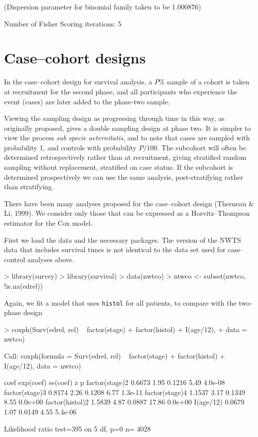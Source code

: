 \documentclass{article}
\begin{document}
\begin{Schunk}
\begin{Soutput}
(Dispersion parameter for binomial family taken to be 1.000876)

Number of Fisher Scoring iterations: 5
\end{Soutput}
\end{Schunk}


\section*{Case--cohort designs}
In the case--cohort design for survival analysis, a $P$\% sample of a cohort
is taken at recruitment for the second phase, and all participants who
experience the event (cases) are later added to the phase-two sample.

Viewing the sampling design as progressing through time in this way,
as originally proposed, gives a double sampling design at phase two.
It is simpler to view the process \emph{sub specie aeternitatis}, and
to note that cases are sampled with probability 1, and controls with
probability $P/100$. The subcohort will often be determined
retrospectively rather than at recruitment, giving stratified random
sampling without replacement, stratified on case status.  If the
subcohort is determined prospectively we can use the same analysis,
post-stratifying rather than stratifying.

There have been many analyses proposed for the case--cohort design
(Therneau \& Li, 1999).  We consider only those that can be expressed as a
Horvitz--Thompson estimator for the Cox model.



First we load the data and the necessary packages. The version of the
NWTS data that includes survival times is not identical to the data
set used for case--control analyses above.
\begin{Schunk}
\begin{Sinput}
> library(survey)
> library(survival)
> data(nwtco)
> ntwco <- subset(nwtco, !is.na(edrel))
\end{Sinput}
\end{Schunk}

Again, we fit a model that uses \texttt{histol} for all patients, to compare with the two-phase design
\begin{Schunk}
\begin{Sinput}
> coxph(Surv(edrel, rel) ~ factor(stage) + factor(histol) + I(age/12), 
+     data = nwtco)
\end{Sinput}
\begin{Soutput}
Call:
coxph(formula = Surv(edrel, rel) ~ factor(stage) + factor(histol) + 
    I(age/12), data = nwtco)


                  coef exp(coef) se(coef)     z       p
factor(stage)2  0.6673      1.95   0.1216  5.49 4.0e-08
factor(stage)3  0.8174      2.26   0.1208  6.77 1.3e-11
factor(stage)4  1.1537      3.17   0.1349  8.55 0.0e+00
factor(histol)2 1.5839      4.87   0.0887 17.86 0.0e+00
I(age/12)       0.0679      1.07   0.0149  4.55 5.4e-06

Likelihood ratio test=395  on 5 df, p=0  n= 4028 
\end{Soutput}
\end{Schunk}
\end{document}
